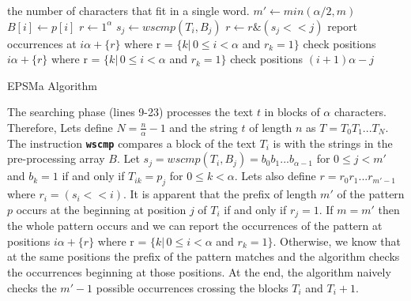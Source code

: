 \begin{algorithm}[H]
\small
\begin{algorithmic}[1]
\State \alpha \gets the number of characters that fit in a single word. 
 
    \State $m' \gets min(\alpha/2, m)$
            \State $B[i] \gets p[i]$
       \EndFor
    \EndFor
        \State $r \gets 1^\alpha$
            \State $s_j \gets wscmp(T_i, B_j)$
            \State $r \gets r \& (s_j << j)$
        \EndFor
            \State report occurrences at $i\alpha + \{r\}$ where r = $\{k | \, 0 \leq i < \alpha$ and $r_k = 1\}$
        \Else
            \State check positions $i\alpha + \{r\}$ where r = $\{k | \, 0 \leq i < \alpha$ and $r_k = 1\}$
        \EndIf
            \State check positions $(i + 1)\alpha - j$
        \EndFor

    \EndFor

\EndFunction
\end{algorithmic}
\caption{EPSMa Algorithm}\label{alg:espma}
\end{algorithm}

The searching phase (lines 9-23) processes the text $t$ in blocks of $\alpha$ characters. Therefore, Lets define  $N = \frac{n}{\alpha} - 1$ and the string $t$ of length $n$ as $T=T_0 T_1...T_N$. The instruction \texttt{\textbf{wscmp}} compares a block of the text $T_i$ is with the strings in the pre-processing array $B$. Let $s_j = wscmp(T_i, B_j) = b_0 b_1 ...b_{\alpha-1}$ for $0 \leq j < m'$ and $b_k = 1$ if and only if $T_{ik} = p_j$ for $0 \leq k < \alpha$. Lets also define $r = r_0 r_1...r_{m'-1}$ where $r_i = (s_i << i)$. It is apparent that the prefix of length $m'$ of the pattern $p$
occurs at the beginning at position $j$ of $T_i$ if and only if $r_j = 1$. If $m = m'$ then the whole pattern occurs and we can report the occurrences of the pattern at positions $i\alpha + \{r\}$ where r = $\{k | \, 0 \leq i < \alpha$ and $r_k = 1\}$. Otherwise, we know that at the same positions the prefix of the pattern matches and the algorithm checks the occurrences beginning at those positions. At the end, the algorithm naively checks the $m' - 1$ possible occurrences crossing the blocks $T_i$ and $T_i+1$.

